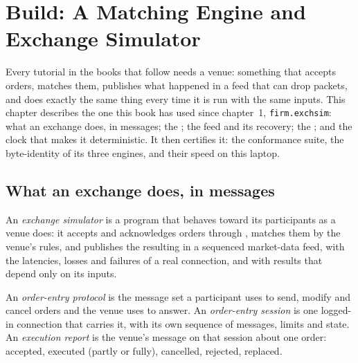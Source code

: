 \chapter{Build: A Matching Engine and Exchange Simulator}\label{ch:mx:build-a-matching-engine-and-exchange-simulator}

Every tutorial in the books that follow needs a venue: something that accepts orders, matches them, publishes what happened in a feed that can drop
packets, and does exactly the same thing every time it is run with the same inputs. This chapter describes the one this book has used since
chapter~1, \texttt{firm.exchsim}: what an exchange does, in messages; the ; the feed and its recovery; the ; and
the clock that makes it deterministic. It then certifies it: the conformance suite, the byte-identity of its three engines, and their speed on this
laptop.

\section{What an exchange does, in messages}

\begin{definition}\label{def:mx:build-a-matching-engine-and-exchange-simulator:sim}
An \emph{exchange simulator} is a program that behaves toward its participants as a venue does: it accepts and acknowledges
orders through , matches them by the venue's rules, and publishes the resulting  in a sequenced market-data feed,
with the latencies, losses and failures of a real connection, and with results that depend only on its inputs.
\end{definition}

\begin{definition}\label{def:mx:build-a-matching-engine-and-exchange-simulator:oe}
An \emph{order-entry protocol} is the message set a participant uses to send, modify and cancel orders and the venue uses to
answer. An \emph{order-entry session} is one logged-in connection that carries it, with its own sequence of messages, limits and
state. An \emph{execution report} is the venue's message on that session about one order: accepted, executed (partly or fully),
cancelled, rejected, replaced.
\end{definition}

